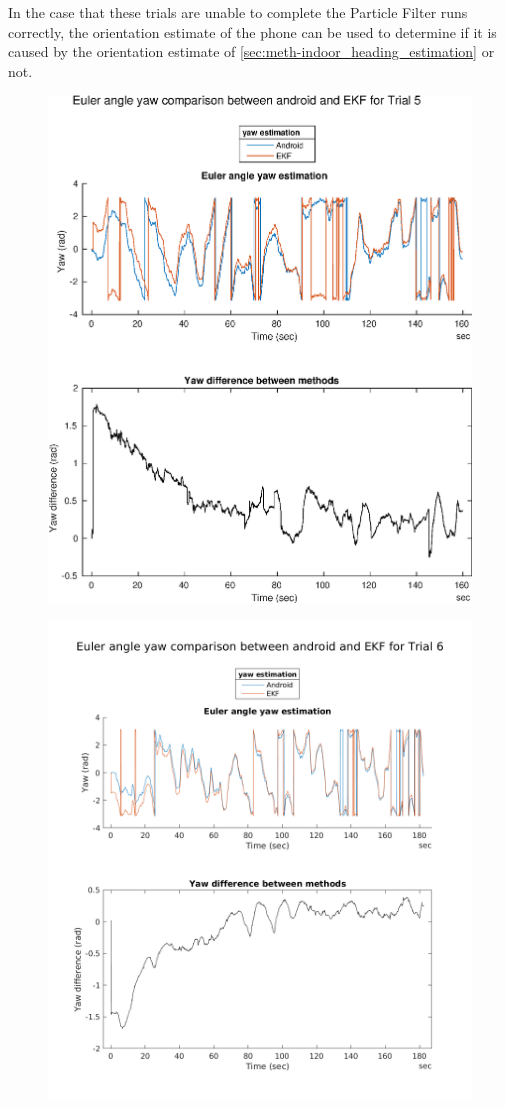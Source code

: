 In the case that these trials are unable to complete the Particle Filter runs correctly, the orientation estimate of the phone can be used to determine if it is caused by the orientation estimate of \cref{sec:meth-indoor_heading_estimation} or not.

\begin{figure}[H]
	\centering
	\includegraphics[width=0.6\linewidth]{images/20201201_1218_Yaw_difference_between_methods}
	\setlength{\belowcaptionskip}{-20pt}
	\caption{}
	\label{fig:trial5_yawdifferencebetweenmethods}
\end{figure}
\begin{figure}[H]
	\centering
	\includegraphics[width=0.7\linewidth]{images/20201201_1219_Yaw_difference_between_methods}
	\setlength{\belowcaptionskip}{-20pt}
	\caption{}
	\label{fig:trial6_yawdifferencebetweenmethods}
\end{figure}

